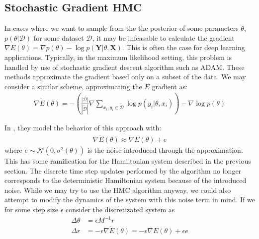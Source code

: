 


    
\subsection{Stochastic Gradient HMC}

In cases where we want to sample from the the posterior of some parameters $\theta$,  $p(\theta | \mathcal{D})$ for some dataset $\mathcal{D}$, it may be infeasable to calculate the gradient $\nabla E(\theta) = \nabla p(\theta) - \log{p(\bm{Y} | \theta, \bm{X})}$. 
This is often the case for deep learning applications.
Typically, in the maximum likelihood setting, this problem is handled by use of stochastic gradient descent algorithm such as ADAM. 
These methods approximate the gradient based only on a subset of the data. 
We may consider a similar scheme, approximating the $E$ gradient as:
\begin{align*}
    \nabla\tilde{E}(\theta) = -\left(\frac{|\mathcal{D}|}{|\tilde{\mathcal{D}}|}  \nabla \sum_{x_i, y_i\in \tilde{\mathcal{D}}} \log{p(y_i |\theta, x_i)}\right)  -\nabla \log{p(\theta)}
\end{align*}

In \cite{chen_stochastic_2014}, they model the behavior of this approach with:
\begin{align*}
    \nabla\tilde{E}(\theta) \approx \nabla{E}(\theta) + e
\end{align*}
where $e \sim \mathcal{N}(0, \sigma^2(\theta))$ is the noise introduced through the approximation. This has some ramification for the Hamiltonian system described in the previous section. 
The discrete time step updates performed by the algorithm no longer corresponds to the deterministic Hamiltonian system because of the introduced noise. 
While we may try to use the HMC algorithm anyway, we could also attempt to modify the dynamics of the system with this noise term in mind.
If we for some step size $\epsilon$ consider the discretizated system as
\begin{align}
    \Delta \theta &=  \epsilon M^{-1} r\\
    \Delta r &=  -\epsilon\nabla{\tilde{E}}(\theta) = -\epsilon\nabla{E}(\theta)  + \epsilon e
\end{align}


